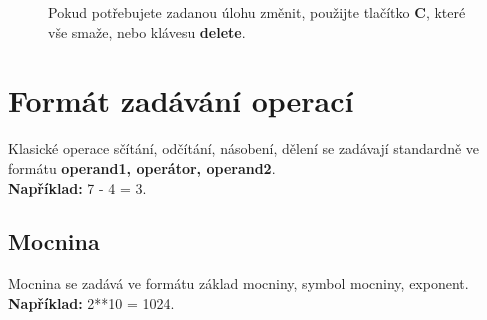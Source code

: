 \documentclass[12pt,czech]{article}
\begin{document}
\begin{figure}[h]
\centering
{}
\caption{Pokud potřebujete zadanou úlohu změnit, použijte tlačítko \textbf{C}, které vše smaže, nebo klávesu \textbf{delete}.}
\end{figure}

\section{Formát zadávání operací}
Klasické operace sčítání, odčítání, násobení, dělení se zadávají \newline
standardně ve formátu \textbf{operand1, operátor, operand2}.\\
\textbf{Například:} 7 - 4 = 3.

\subsection{Mocnina}
Mocnina se zadává ve formátu základ mocniny, symbol mocniny, exponent.\\
\textbf{Například:} 2**10 = 1024.
\end{document}
